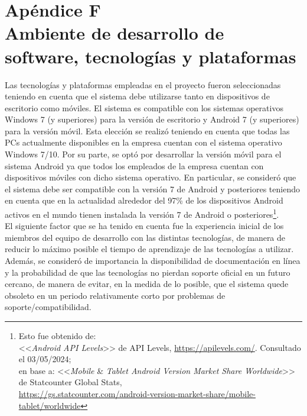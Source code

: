 \documentclass[a4paper, 12pt,twoside]{report}  %
\numberwithin{equation}{subsection} %
\begin{document}
\chapter*{\hypertarget{apendice_f}{}Apéndice F\\Ambiente de desarrollo de software, tecnologías y plataformas}

\indent Las tecnologías y plataformas empleadas en el proyecto fueron seleccionadas teniendo en cuenta que el sistema debe utilizarse tanto en dispositivos de escritorio como móviles. El sistema es compatible con los sistemas operativos Windows 7 (y superiores) para la versión de escritorio y Android 7 (y superiores) para la versión móvil. Esta elección se realizó teniendo en cuenta que todas las PCs actualmente disponibles en la empresa cuentan con el sistema operativo Windows 7/10. Por su parte, se optó por desarrollar la versión móvil para el sistema Android ya que todos los empleados de la empresa cuentan con dispositivos móviles con dicho sistema operativo. En particular, se consideró que el sistema debe ser compatible con la versión 7 de Android y posteriores teniendo en cuenta que en la actualidad alrededor del 97\% de los dispositivos Android activos en el mundo tienen instalada la versión 7 de Android o posteriores\footnote{Esto fue obtenido de:\\
	<<\textit{Android API Levels}>> de API Levels, \url{https://apilevels.com/}. Consultado el 03/05/2024;\\
	en base a: <<\textit{Mobile} \& \textit{Tablet Android Version Market Share Worldwide}>> de Statcounter Global Stats,\\ \url{https://gs.statcounter.com/android-version-market-share/mobile-tablet/worldwide}}.\\
\indent El siguiente factor que se ha tenido en cuenta fue la experiencia inicial de los miembros del equipo de desarrollo con las distintas tecnologías, de manera de reducir lo máximo posible el tiempo de aprendizaje de las tecnologías a utilizar. Además, se consideró de importancia la disponibilidad de documentación en línea y la probabilidad de que las tecnologías no pierdan soporte oficial en un futuro cercano, de manera de evitar, en la medida de lo posible, que el sistema quede obsoleto en un periodo relativamente corto por problemas de soporte/compatibilidad.\\
\end{document}
